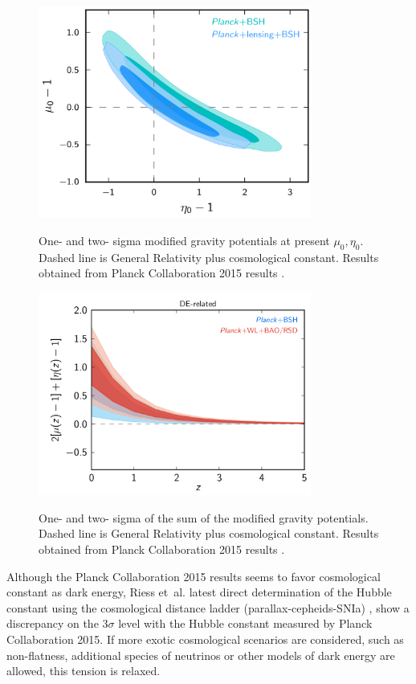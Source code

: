 \begin{figure}
\begin{center}
\includegraphics[width=0.8\textwidth]{./Pictures/mg_planck2015.png}
\caption{One- and two- sigma modified gravity potentials at present $\mu_0,\eta_0$. Dashed line is General Relativity plus cosmological constant. Results obtained from Planck Collaboration 2015 results \cite{2016A&A...594A..14P}.}
\label{fig:mg_planck2015}
\vspace*{0.2cm}
\includegraphics[width=0.8\textwidth]{./Pictures/munu_planck2015.png}
\caption{One- and two- sigma of the sum of the modified gravity potentials. Dashed line is General Relativity plus cosmological constant. Results obtained from Planck Collaboration 2015 results \cite{2016A&A...594A..14P}. }
\label{fig:munu_planck2015}
\end{center}
\end{figure}

Although the Planck Collaboration 2015 results seems to favor cosmological constant as dark energy, Riess et~al. latest direct determination of the Hubble constant using the cosmological distance ladder (parallax-cepheids-SNIa) \cite{2016ApJ...826...56R}, show a discrepancy on the $3\sigma$ level with the Hubble constant measured by Planck Collaboration 2015. If more exotic cosmological scenarios are considered, such as non-flatness, additional species of neutrinos or other models of dark energy are allowed, this tension is relaxed. 
\newline

